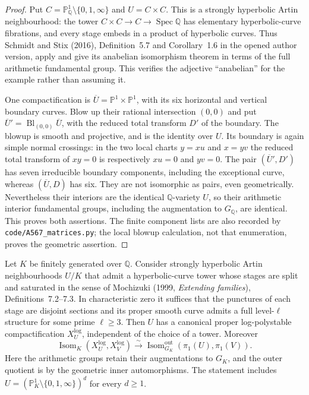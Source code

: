 \begin{proof}
Put $C=\mathbb P^1_{\mathbb Q}\setminus\{0,1,\infty\}$ and
$U=C\times C$. This is a strongly hyperbolic Artin neighbourhood:
the tower $C\times C\to C\to\operatorname{Spec}\mathbb Q$ has
elementary hyperbolic-curve fibrations, and every stage embeds in a
product of hyperbolic curves. Thus Schmidt and Stix (2016),
Definition~5.7 and Corollary~1.6 in the opened author version, apply
and give its anabelian isomorphism theorem in terms of the full
arithmetic fundamental group. This verifies the adjective
``anabelian'' for the example rather than assuming it.

One compactification is
$\overline U=\mathbb P^1\times\mathbb P^1$, with its six horizontal
and vertical boundary curves. Blow up their rational intersection
$(0,0)$ and put
$\overline U'=\operatorname{Bl}_{(0,0)}\overline U$, with the reduced
total transform $D'$ of the boundary. The blowup is smooth and
projective, and is the identity over $U$. Its boundary is again simple
normal crossings: in the two local charts $y=xu$ and $x=yv$ the
reduced total transform of $xy=0$ is respectively $xu=0$ and $yv=0$.
The pair $(\overline U',D')$ has seven irreducible boundary components,
including the exceptional curve, whereas $(\overline U,D)$ has six.
They are not isomorphic as pairs, even geometrically. Nevertheless
their interiors are the identical $\mathbb Q$-variety $U$, so their
arithmetic interior fundamental groups, including the augmentation
to $G_{\mathbb Q}$, are identical. This proves both assertions.
The finite component lists are also recorded by
\texttt{code/A567\_matrices.py}; the local blowup calculation, not
that enumeration, proves the geometric assertion.
\end{proof}

\begin{theorem}
\label{A:polystable-compactification}
Let $K$ be finitely generated over $\mathbb Q$. Consider strongly
hyperbolic Artin neighbourhoods $U/K$ that admit a hyperbolic-curve
tower whose stages are split and saturated in the sense of
Mochizuki (1999, \emph{Extending families}), Definitions~7.2--7.3.
In characteristic zero it suffices that the punctures of each stage
are disjoint sections and its proper smooth curve admits a full
level-$\ell$ structure for some prime $\ell\ge3$.
Then $U$ has a canonical proper log-polystable compactification
$X_U^{\log}$, independent of the choice of a tower. Moreover
\[
 \operatorname{Isom}_K(X_U^{\log},X_V^{\log})
 \xrightarrow{\ \sim\ }
 \operatorname{Isom}^{\mathrm{out}}_{G_K}
       (\pi_1(U),\pi_1(V)).
\]
Here the arithmetic groups retain their augmentations to $G_K$,
and the outer quotient is by the geometric inner automorphisms.
The statement includes $U=(\mathbb P^1_K\setminus\{0,1,\infty\})^d$
for every $d\ge1$.
\end{theorem}

